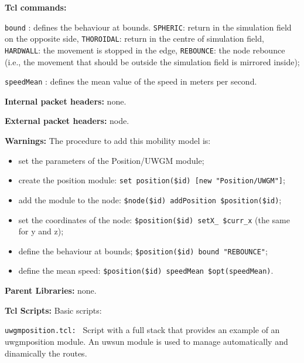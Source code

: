 \begin{description}
\begin{description}
   \end{description}
   \item {\bf Tcl commands:}
   \begin{description}
    \item {\tt bound} : defines the behaviour at bounds. {\tt SPHERIC}: return in the simulation field on the opposite side, {\tt THOROIDAL}: return in the centre of simulation field, {\tt HARDWALL}: the movement is stopped in the edge, {\tt REBOUNCE}: the node rebounce (i.e., the movement that should be outside the simulation field is mirrored inside);
    \item {\tt speedMean} : defines the mean value of the speed in meters per second.
   \end{description}
   \item {\bf Internal packet headers:} none.
   \item {\bf External packet headers:} node.
   \item {\bf Warnings:} The procedure to add this mobility model is:
   \begin{itemize}
    \item set the parameters of the Position/UWGM module;
    \item create the position module: {\tt set position(\$id) [new "Position/UWGM"]};
    \item add the module to the node: {\tt \$node(\$id) addPosition \$position(\$id)};
    \item set the coordinates of the node: {\tt \$position(\$id) setX\_ \$curr\_x} (the same for y and z);
    \item define the behaviour at bounds; {\tt \$position(\$id) bound "REBOUNCE"};
    \item define the mean speed: {\tt \$position(\$id) speedMean \$opt(speedMean)}.
   \end{itemize}
   \item {\bf Parent Libraries:} none.
   \item {\bf Tcl Scripts:} 
   Basic scripts:
   \begin{description}
   \item {\tt uwgmposition.tcl: } Script with a full stack that provides an example of an uwgmposition module. An uwsun module is used to manage automatically and dinamically the routes.
   \end{description}
\end{description}

\vspace{1 cm}

